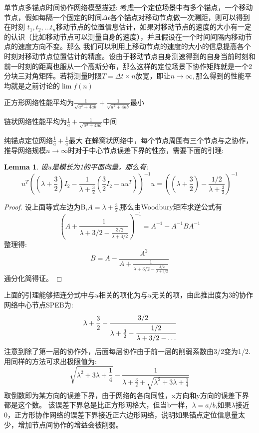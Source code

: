 \documentclass[12pt]{article}
\newtheorem{lem}[thm]{Lemma}
\theoremstyle{remark}
\begin{document}
\title{\textbf{}}

\author{}
\maketitle
\large
单节点多锚点时间协作网络模型描述:
考虑一个定位场景中有多个锚点，一个移动节点，假如每隔一个固定的时间$\Delta t$各个锚点对移动节点做一次测距，则可以得到在时刻
$t_1,t_2,...t_n$移动节点的位置信息估计，如果对移动节点的速度的大小有一定的认识（比如移动节点可以测量自身的速度），并且假设在一个时间间隔内移动节点的速度方向不变。那么
我们可以利用上移动节点的速度的大小的信息提高各个时刻对移动节点位置估计的精度。设由于移动节点自身测速得到的自身当前时刻和前一时刻的距离也服从一个高斯分布，那么这样的定位场景下协作矩阵就是一个2分块三对角矩阵。若将测量时限$T=\Delta t\times n$放宽，即让$n\to \infty,$那么得到的性能平均就是之前讨论的$\lim f(n)$

正方形网络性能平均为$\frac{1}{\sqrt{a^2+4ab}}+\frac{1}{\sqrt{a^2+4ab}}$最小

链状网络性能平均为$\frac{1}{a}+\frac{1}{\sqrt{a^2+4ab}}$中间

纯锚点定位网络$\frac{1}{a}+\frac{1}{a}$最大
在蜂窝状网络中，每个节点周围有三个节点与之协作，推导网络规模$n\to \infty$时对于中心节点误差下界的性态，需要下面的引理:
\begin{lem}
  设$u$是模长为1的平面向量，那么有:
\begin{equation}\label{eq:equiv}
  u^T((\lambda+\frac{3}{2})I_2-\frac{1}{\lambda+\frac{3}{2}}(\frac{3}{2}I_2-uu^T))^{-1}u
  =((\lambda+\frac{3}{2})-\frac{1/2}{\lambda+\frac{3}{2}})^{-1}
\end{equation}
\end{lem}
\begin{proof}
  设上面等式左边为B,$A=\lambda+\frac{3}{2}$,那么由Woodbury矩阵求逆公式有
  \[
  (A+\frac{1}{\lambda+3/2-\frac{3/2}{\lambda+3/2}})^{-1}=A^{-1}-A^{-1}BA^{-1}
  \]
  整理得:
  \[
  B=A-\frac{A^2}{A+\frac{1}{\lambda+3/2-\frac{3/2}{\lambda+3/2}}}
  \]
  通分化简得证。
  \end{proof}
  上面的引理能够把连分式中与$u$相关的项化为与$u$无关的项，由此推出度为3的协作网络中心节点SPEB为:
  \[
\lambda+\frac{3}{2}-\cfrac{3/2}{\lambda+\frac{3}{2}-\cfrac{1/2}{\lambda+3/2-\dots}}
  \]
  注意到除了第一层的协作外，后面每层协作由于前一层的削弱系数由3/2变为1/2.
  用同样的方法可求出极限值为:
  \[
  \sqrt{\lambda^2+3\lambda+\frac{1}{4}}-\frac{1}{\lambda+\frac{3}{2}+\sqrt{\lambda^2+3\lambda+\frac{1}{4}}}
  \]
  取倒数即为某方向的误差下界，由于网络的各向同性，x方向和y方向的误差下界都是这个数。
该误差下界总是比正方形网格大，但当b一样，$\lambda=a/b$,如果$\lambda$接近0，正方形协作网络的误差下界接近正六边形网络，说明如果锚点定位信息量太少，增加节点间协作的增益会被削弱。
\end{document}
